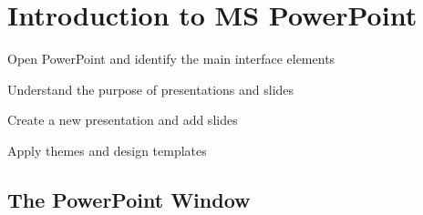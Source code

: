 \chapter{Introduction to MS PowerPoint}
\label{ch:ppt-intro}

\begin{objectives}
  \item Open PowerPoint and identify the main interface elements
  \item Understand the purpose of presentations and slides
  \item Create a new presentation and add slides
  \item Apply themes and design templates
\end{objectives}


\section{The PowerPoint Window}
\label{sec:ppt-window}

